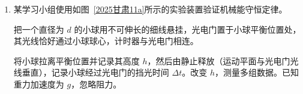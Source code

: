 \documentclass[\gkver]{gaokaozhenti}
\begin{document}
\begin{enumerate}
{设外圆半径等于 $R'$，由几何关系得 $\angle AO'B = 270\Udu$

则 $R' = R_{0} + \sqrt{2}R_{0}$

A 错误；

B．由 A 项分析，a 粒子返回 A 点所用的最短时间为第一次回到 A 点的时间 $t_{\min}$

a 粒子做匀速圆周运动的周期 $T = \frac{2\pi R_{0}}{v_{a}} = \frac{2\pi m}{qB}$

在磁场中运动的时间 $t_{1} = \frac{540\Udu}{360\Udu} \cdot T = \frac{3\pi m}{qB}$

匀速直线运动的时间 $t_{2} = \frac{2R_{0}}{v_{a}} = \frac{2m}{qB}$

故 a 粒子返回 A 点所用的最短时间为 $t_{\min} = t_{1} + t_{2} = \frac{(3\pi + 2)m}{qB}$

B 正确；

C．由题意，作出 b、c 粒子运动轨迹图，如图所示


因为 b、c 粒子返回 A 点都是运动一个圆周，根据 b、c 带正电且比荷均为 $\frac{q}{m}$，所以两粒子做圆周运动周期相同，故所用的最短时间之比为 $1:1$，C 错误；

D．由几何关系得 $2R_{c} = \sqrt{2}R_{0}$

洛伦兹力提供向心力有 $qv_{c}B = \frac{mv_{c}^{2}}{R_{c}}$

联立解得 $v_{c} = \frac{\sqrt{2}}{2}v_{a}$

D 正确。

故选 BD。
}

\item
某学习小组使用如图~\ref{2025甘肃11a}所示的实验装置验证机械能守恒定律。

把一个直径为 $d$ 的小球用不可伸长的细线悬挂，光电门置于小球平衡位置处，其光线恰好通过小球球心，计时器与光电门相连。

将小球拉离平衡位置并记录其高度 $h$，然后由静止释放（运动平面与光电门光线垂直），记录小球经过光电门的挡光时间 $\Delta t$。改变 $h$，测量多组数据。已知重力加速度为 $g$，忽略阻力。


\end{enumerate}
\end{document}
